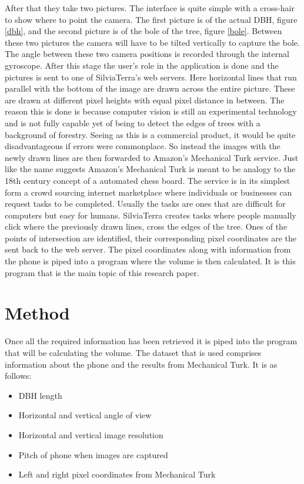 After that they take two pictures. The interface is quite simple with a cross-hair to show where to point the camera. The first picture is of the actual DBH, figure \ref{dbh}, and the second picture is of the bole of the tree, figure \ref{bole}. Between these two pictures the camera will have to be tilted vertically to capture the bole. The angle between these two camera positions is recorded through the internal gyroscope. After this stage the user's role in the application is done and the pictures is sent to one of SilviaTerra's web servers. Here horizontal lines that run parallel with the bottom of the image are drawn across the entire picture. These are drawn at different pixel heights with equal pixel distance in between. The reason this is done is because computer vision is still an experimental technology and is not fully capable yet of being to detect the edges of trees with a background of forestry. Seeing as this is a commercial product, it would be quite disadvantageous if errors were commonplace. So instead the images with the newly drawn lines are then forwarded to Amazon's Mechanical Turk service. Just like the name suggests Amazon's Mechanical Turk is meant to be analogy to the 18th century concept of a automated chess board. The service is in its simplest form a crowd sourcing internet marketplace where individuals or businesses can request tasks to be completed. Usually the tasks are ones that are difficult for computers but easy for humans. SilviaTerra creates tasks where people manually click where the previously drawn lines, cross the edges of the tree. Ones of the points of intersection are identified, their corresponding pixel coordinates are the sent back to the web server. The pixel coordinates along with information from the phone is piped into a program where the volume is then calculated. It is this program that is the main topic of this research paper.

\section{Method}
Once all the required information has been retrieved it is piped into the program that will be calculating the volume. The dataset that is used comprises information about the phone and the results from Mechanical Turk. It is as follows:
\begin{itemize}
	\item DBH length
	\item Horizontal and vertical angle of view
	\item Horizontal and vertical image resolution
	\item Pitch of phone when images are captured
	\item Left and right pixel coordinates from Mechanical Turk
\end{itemize}

